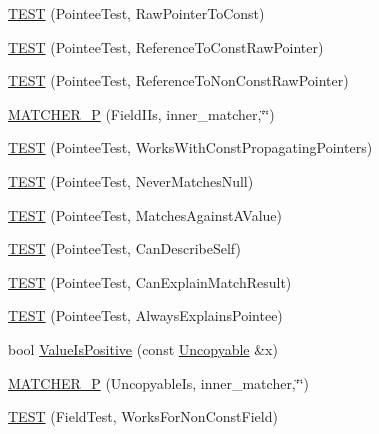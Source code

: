 \begin{DoxyCompactItemize}
\item 
\hyperlink{namespacetesting_1_1gmock__matchers__test_a84a21ee7de697401049cb932f859ee33}{T\+E\+ST} (Pointee\+Test, Raw\+Pointer\+To\+Const)
\item 
\hyperlink{namespacetesting_1_1gmock__matchers__test_aebba40e49fe790490ba88984fdc7c7a6}{T\+E\+ST} (Pointee\+Test, Reference\+To\+Const\+Raw\+Pointer)
\item 
\hyperlink{namespacetesting_1_1gmock__matchers__test_a2d2296f6b23130be225b8df48746dfd5}{T\+E\+ST} (Pointee\+Test, Reference\+To\+Non\+Const\+Raw\+Pointer)
\item 
\hyperlink{namespacetesting_1_1gmock__matchers__test_a43d7cb618a83048cd99b55edbec586bb}{M\+A\+T\+C\+H\+E\+R\+\_\+P} (Field\+I\+Is, inner\+\_\+matcher,\char`\"{}\char`\"{})
\item 
\hyperlink{namespacetesting_1_1gmock__matchers__test_a9d851a5bb597fa45b5d1cf3f295398e8}{T\+E\+ST} (Pointee\+Test, Works\+With\+Const\+Propagating\+Pointers)
\item 
\hyperlink{namespacetesting_1_1gmock__matchers__test_ac778a9cebf9306a5efd27cc1186d8269}{T\+E\+ST} (Pointee\+Test, Never\+Matches\+Null)
\item 
\hyperlink{namespacetesting_1_1gmock__matchers__test_afe22e8230dc7a34498e4b2f91dcdd7cd}{T\+E\+ST} (Pointee\+Test, Matches\+Against\+A\+Value)
\item 
\hyperlink{namespacetesting_1_1gmock__matchers__test_ac8b9baa938635d587f0b0df1073208e2}{T\+E\+ST} (Pointee\+Test, Can\+Describe\+Self)
\item 
\hyperlink{namespacetesting_1_1gmock__matchers__test_a263ede06f6b32a625bb40e4f4c58c8dc}{T\+E\+ST} (Pointee\+Test, Can\+Explain\+Match\+Result)
\item 
\hyperlink{namespacetesting_1_1gmock__matchers__test_a00128de027ff6f49f82a7011dd346d43}{T\+E\+ST} (Pointee\+Test, Always\+Explains\+Pointee)
\item 
bool \hyperlink{namespacetesting_1_1gmock__matchers__test_a7c429b4fa8a7835724d9e28033e908b2}{Value\+Is\+Positive} (const \hyperlink{classtesting_1_1gmock__matchers__test_1_1_uncopyable}{Uncopyable} \&x)
\item 
\hyperlink{namespacetesting_1_1gmock__matchers__test_afcdfddd9d56b20c0692a360115189836}{M\+A\+T\+C\+H\+E\+R\+\_\+P} (Uncopyable\+Is, inner\+\_\+matcher,\char`\"{}\char`\"{})
\item 
\hyperlink{namespacetesting_1_1gmock__matchers__test_a57213a63527bbd66c024dd1cfafe92d1}{T\+E\+ST} (Field\+Test, Works\+For\+Non\+Const\+Field)

\end{DoxyCompactItemize}
